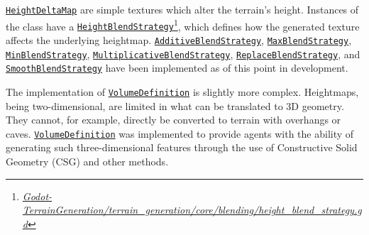 \href{https://github.com/fsande/TFG---Eric-Rios/blob/main/Godot-TerrainGeneration/terrain_generation/core/height_delta_map.gd}{\texttt{HeightDeltaMap}} are simple textures which alter the terrain's height. 
Instances of the class have a \href{https://github.com/fsande/TFG---Eric-Rios/blob/main/Godot-TerrainGeneration/terrain_generation/core/blending/height_blend_strategy.gd}{\texttt{HeightBlendStrategy}}\footnote{\href{https://github.com/fsande/TFG---Eric-Rios/blob/main/Godot-TerrainGeneration/terrain_generation/core/blending/height_blend_strategy.gd}{\textit{Godot-TerrainGeneration/terrain\_generation/core/blending/height\_blend\_strategy.gd}}}, which defines how the generated texture affects the underlying heightmap.
\href{https://github.com/fsande/TFG---Eric-Rios/blob/main/Godot-TerrainGeneration/terrain_generation/core/blending/additive_blend_strategy.gd}{\texttt{AdditiveBlendStrategy}}, \href{https://github.com/fsande/TFG---Eric-Rios/blob/main/Godot-TerrainGeneration/terrain_generation/core/blending/max_blend_strategy.gd}{\texttt{MaxBlendStrategy}}, \href{https://github.com/fsande/TFG---Eric-Rios/blob/main/Godot-TerrainGeneration/terrain_generation/core/blending/min_blend_strategy.gd}{\texttt{MinBlendStrategy}}, \href{https://github.com/fsande/TFG---Eric-Rios/blob/main/Godot-TerrainGeneration/terrain_generation/core/blending/multiplicative_blend_strategy.gd}{\texttt{MultiplicativeBlendStrategy}}, \href{https://github.com/fsande/TFG---Eric-Rios/blob/main/Godot-TerrainGeneration/terrain_generation/core/blending/replace_blend_strategy.gd}{\texttt{ReplaceBlendStrategy}}, and \href{https://github.com/fsande/TFG---Eric-Rios/blob/main/Godot-TerrainGeneration/terrain_generation/core/blending/smooth_blend_strategy.gd}{\texttt{SmoothBlendStrategy}} have been implemented as of this point in development.

The implementation of \href{https://github.com/fsande/TFG---Eric-Rios/blob/main/Godot-TerrainGeneration/terrain_generation/agents/volume_definition.gd}{\texttt{VolumeDefinition}} is slightly more complex.
Heightmaps, being two-dimensional, are limited in what can be translated to 3D geometry.
They cannot, for example, directly be converted to terrain with overhangs or caves.
\href{https://github.com/fsande/TFG---Eric-Rios/blob/main/Godot-TerrainGeneration/terrain_generation/agents/volume_definition.gd}{\texttt{VolumeDefinition}} was implemented to provide agents with the ability of generating such three-dimensional features through the use of Constructive Solid Geometry (CSG) and other methods.

